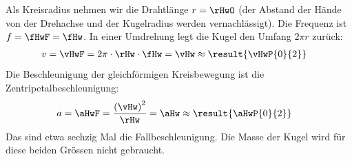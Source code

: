 Als Kreisradius nehmen wir die Drahtlänge $r = \rHwO$ (der Abstand der Hände von der Drehachse und der Kugelradius werden vernachlässigt). Die Frequenz ist $f = \fHwF = \fHw$. In einer Umdrehung legt die Kugel den Umfang $2\pi r$ zurück:
\begin{align}
 v &= \vHwF = 2\pi\cdot\rHw\cdot\fHw = \vHw \approx \result{\vHwP{0}{2}}
\end{align}
Die Beschleunigung der gleichförmigen Kreisbewegung ist die Zentripetalbeschleunigung:
\begin{align}
 a &= \aHwF = \frac{\left(\vHw\right)^2}{\rHw} = \aHw \approx \result{\aHwP{0}{2}}
\end{align}
Das sind etwa sechzig Mal die Fallbeschleunigung. Die Masse der Kugel wird für diese beiden Grössen nicht gebraucht.

